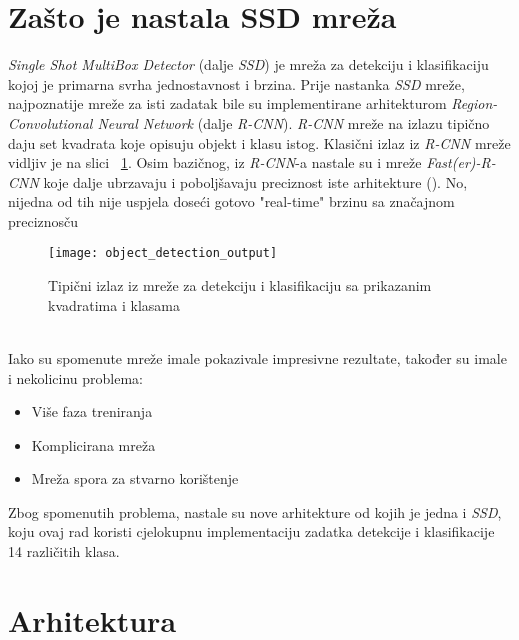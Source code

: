 \section{Zašto je nastala SSD mreža}
\emph{Single Shot MultiBox Detector} (dalje \emph{SSD}) je mreža za detekciju i klasifikaciju kojoj je primarna svrha jednostavnost i brzina.
Prije nastanka \emph{SSD} mreže, najpoznatije mreže za isti zadatak bile su implementirane arhitekturom \emph{Region-Convolutional Neural Network} (dalje \emph{R-CNN}).
\emph{R-CNN} mreže na izlazu tipično daju set kvadrata koje opisuju objekt i klasu istog.
Klasični izlaz iz \emph{R-CNN} mreže vidljiv je na slici ~\ref{fig:ObjectDetectionOutput}.
Osim bazičnog, iz \emph{R-CNN}-a nastale su i mreže \emph{Fast(er)-R-CNN} koje dalje ubrzavaju i poboljšavaju preciznost iste arhitekture (\cite{ren2015faster}).
No, nijedna od tih nije uspjela doseći gotovo "real-time" brzinu sa značajnom preciznosču
\begin{figure}[h!]
	\centering
	\texttt{[image: object\_detection\_output]}
	 \caption{Tipični izlaz iz mreže za detekciju i klasifikaciju sa prikazanim kvadratima i klasama}
 	 \label{fig:ObjectDetectionOutput}
\end{figure} \\
Iako su spomenute mreže imale pokazivale impresivne rezultate, također su imale i nekolicinu problema:
\begin{itemize}
\item Više faza treniranja
\item Komplicirana mreža
\item Mreža spora za stvarno korištenje
\end{itemize}
Zbog spomenutih problema, nastale su nove arhitekture od kojih je jedna i \emph{SSD}, koju ovaj rad koristi cjelokupnu implementaciju zadatka detekcije i klasifikacije 14 različitih klasa.

\section{Arhitektura}
